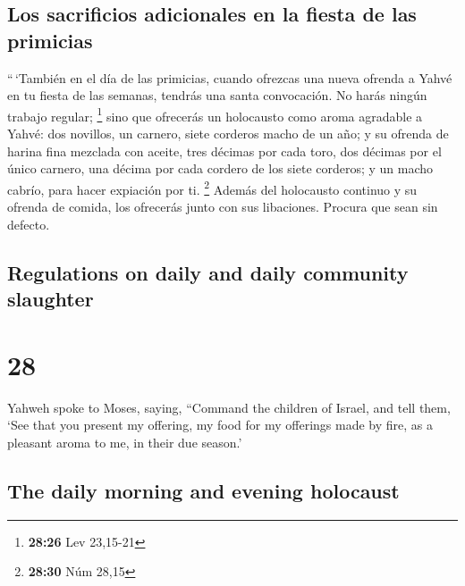 \begin{paracol}{2}
\hypertarget{los-sacrificios-adicionales-en-la-fiesta-de-las-primicias}{%
\subsection{Los sacrificios adicionales en la fiesta de las
primicias}\label{los-sacrificios-adicionales-en-la-fiesta-de-las-primicias}}

 ``\,`También en el día de las primicias, cuando ofrezcas
una nueva ofrenda a Yahvé en tu fiesta de las semanas, tendrás una santa
convocación. No harás ningún trabajo regular; \footnote{\textbf{28:26}
  Lev 23,15-21}  sino que ofrecerás un holocausto como
aroma agradable a Yahvé: dos novillos, un carnero, siete corderos macho
de un año;  y su ofrenda de harina fina mezclada con
aceite, tres décimas por cada toro, dos décimas por el único carnero,
 una décima por cada cordero de los siete corderos;
 y un macho cabrío, para hacer expiación por ti.
\footnote{\textbf{28:30} Núm 28,15}  Además del
holocausto continuo y su ofrenda de comida, los ofrecerás junto con sus
libaciones. Procura que sean sin defecto.

\switchcolumn
\begin{otherlanguage}{english}

\hypertarget{regulations-on-daily-and-daily-community-slaughter}{%
\subsection{Regulations on daily and daily community
slaughter}\label{regulations-on-daily-and-daily-community-slaughter}}

\hypertarget{section-55}{%
\section{28}\label{section-55}}

 Yahweh spoke to Moses, saying,  ``Command
the children of Israel, and tell them, `See that you present my
offering, my food for my offerings made by fire, as a pleasant aroma to
me, in their due season.'

\hypertarget{the-daily-morning-and-evening-holocaust}{%
\subsection{The daily morning and evening
holocaust}\label{the-daily-morning-and-evening-holocaust}}


\end{otherlanguage}
\end{paracol}
